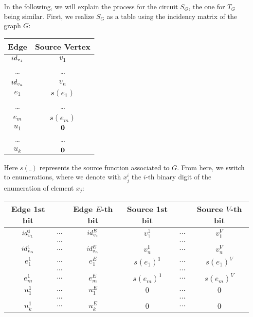 In the following, we will explain the process for the circuit $S_G$, 
the one for $T_G$ being similar. First, we realize $S_G$ as a table using the incidency 
matrix of the graph $G$:
%
%
\begin{center}\scriptsize
  \begin{tabular}{c|c}
    Edge & Source Vertex\\
  \hline
    $id_{v_1}$   & $v_1$\\
    \dots              & \dots \\
    $id_{v_n}$   & $v_n$ \\
    $e_1$           & $s(e_1)$ \\
    \dots             & \dots \\
    $e_m$          & $s(e_m)$\\
    $u_1$           & $\textbf{0}$ \\
    \dots             & \dots \\
    $u_k$           & $\textbf{0}$\\
  \end{tabular}
\end{center}
%
Here $s(\_)$ represents the source function associated to $G$.
From here, we switch to enumerations, where we denote 
with $x^i_j$ the $i$-th binary digit of the enumeration of 
element $x_j$:
%
%
\begin{center}\scriptsize
  \begin{tabular}{ccc|ccc}
    Edge 1st bit & & Edge $E$-th bit & Source 1st bit && Source $V$-th bit\\
  \hline
    $id_{v_1}^1$ & $\dots$ & $id_{v_1}^E$ & $v_1^1$       & $\dots$ & $v_1^V$\\
                           & $\dots$ &                         &                      & $\dots$ & \\
    $id_{v_n}^1$ & $\dots$ & $id_{v_n}^E$ & $v_n^1$       & $\dots$ & $v_n^V$\\
    $e_1^1$          & $\dots$ & $e_1^E$         & $s(e_1)^1$   & $\dots$ & $s(e_1)^V$\\
                            & $\dots$ &                        &                      & $\dots$ & \\
    $e_m^1$         & $\dots$ & $e_m^E$        & $s(e_m)^1$  & $\dots$ & $s(e_m)^V$\\
    $u_1^1$          & $\dots$ & $u_1^E$         & $0$               & $\dots$ & $0$\\
                            & $\dots$ &                        &                      & $\dots$ & \\
    $u_k^1$          & $\dots$ & $u_k^E$         & $0$               & $\dots$ & $0$\\
  \end{tabular}
\end{center}

